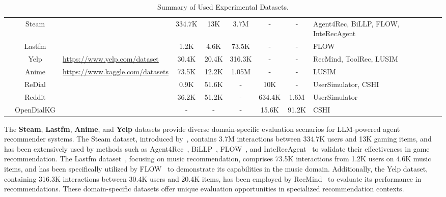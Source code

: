 \begin{table*}[t]
{\begin{tabular}{p{2.5cm}cp{4cm}cccccp{4cm}}
    & Steam & \cite{kang2018self} & 334.7K & 13K & 3.7M &- & - & Agent4Rec, BiLLP, FLOW, InteRecAgent \\
 & Lastfm & \cite{cantador2011second} & 1.2K & 4.6K & 73.5K &- & - & FLOW  \\
 & Yelp & \url{https://www.yelp.com/dataset} & 30.4K & 20.4K & 316.3K &- & - & RecMind, ToolRec, LUSIM \\
 & Anime & \url{https://www.kaggle.com/datasets} & 73.5K & 12.2K & 1.05M &- & - & LUSIM \\
\midrule
{} & ReDial & \cite{li2018towards} & 0.9K & 51.6K & - & 10K & - & UserSimulator, CSHI\\
& Reddit & \cite{he2023large} & 36.2K  & 51.2K & - & 634.4K  & 1.6M & UserSimulator \\
& OpenDialKG & \cite{moon2019opendialkg} & -  & - &  - & 15.6K & 91.2K & CSHI \\
\bottomrule[1.5pt]
\end{tabular}}
\centering
\caption{Summary of Used Experimental Datasets.}
\label{tab:traditional}
\end{table*}

The \textbf{Steam}, \textbf{Lastfm}, \textbf{Anime}, and \textbf{Yelp} datasets provide diverse domain-specific evaluation scenarios for LLM-powered agent recommender systems. 
The Steam dataset, introduced by~\cite{kang2018self}, contains 3.7M interactions between 334.7K users and 13K gaming items, and has been extensively used by methods such as Agent4Rec~\cite{zhang2024generative}, BiLLP~\cite{shi2024large}, FLOW~\cite{cai2024flow}, and InteRecAgent~\cite{huang2023recommender} to validate their effectiveness in game recommendation. 
The Lastfm dataset~\cite{cantador2011second}, focusing on music recommendation, comprises 73.5K interactions from 1.2K users on 4.6K music items, and has been specifically utilized by FLOW~\cite{cai2024flow} to demonstrate its capabilities in the music domain. 
Additionally, the Yelp dataset, containing 316.3K interactions between 30.4K users and 20.4K items, has been employed by RecMind~\cite{wang2024recmind} to evaluate its performance in recommendations.
These domain-specific datasets offer unique evaluation opportunities in specialized recommendation contexts.

